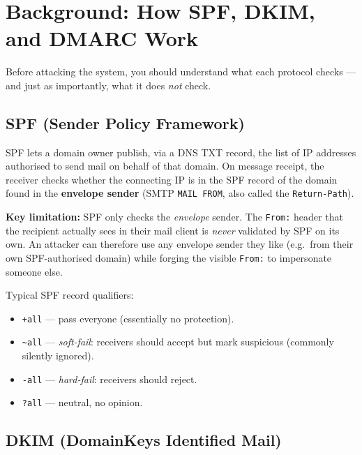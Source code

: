 \documentclass[11pt]{article}
\begin{document}
\section{Background: How SPF, DKIM, and DMARC Work}

Before attacking the system, you should understand what each protocol
checks --- and just as importantly, what it does \emph{not} check.

\subsection{SPF (Sender Policy Framework)}

SPF lets a domain owner publish, via a DNS TXT record, the list of IP
addresses authorised to send mail on behalf of that domain.
On message receipt, the receiver checks whether the connecting IP is in
the SPF record of the domain found in the \textbf{envelope sender}
(SMTP \texttt{MAIL FROM}, also called the \texttt{Return-Path}).

\begin{infobox}
\textbf{Key limitation:} SPF only checks the \emph{envelope} sender.
The \texttt{From:} header that the recipient actually sees in their
mail client is \emph{never} validated by SPF on its own. An attacker
can therefore use any envelope sender they like (e.g.\ from their own
SPF-authorised domain) while forging the visible \texttt{From:} to
impersonate someone else.
\end{infobox}

Typical SPF record qualifiers:
\begin{itemize}[noitemsep]
  \item \texttt{+all} --- pass everyone (essentially no protection).
  \item \texttt{\textasciitilde all} --- \emph{soft-fail}: receivers should
        accept but mark suspicious (commonly silently ignored).
  \item \texttt{-all} --- \emph{hard-fail}: receivers should reject.
  \item \texttt{?all} --- neutral, no opinion.
\end{itemize}

\subsection{DKIM (DomainKeys Identified Mail)}
\end{document}
